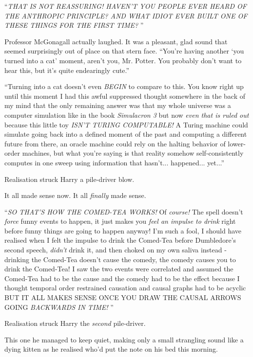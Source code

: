 ``\emph{THAT IS NOT REASSURING! HAVEN'T YOU PEOPLE EVER HEARD OF THE
ANTHROPIC PRINCIPLE? AND WHAT IDIOT EVER BUILT ONE OF THESE THINGS FOR
THE FIRST TIME?} ''

Professor McGonagall actually laughed. It was a pleasant, glad sound
that seemed surprisingly out of place on that stern face. ``You're
having another `you turned into a cat' moment, aren't you, Mr. Potter.
You probably don't want to hear this, but it's quite endearingly cute.''

``Turning into a cat doesn't even \emph{BEGIN} to compare to this. You
know right up until this moment I had this awful suppressed thought
somewhere in the back of my mind that the only remaining answer was that
my whole universe was a computer simulation like in the book
\emph{Simulacron 3} but now \emph{even that is ruled out} because this
little toy \emph{ISN'T TURING COMPUTABLE!} A Turing machine could
simulate going back into a defined moment of the past and computing a
different future from there, an oracle machine could rely on the halting
behavior of lower-order machines, but what you're saying is that reality
somehow self-consistently computes in one sweep using information that
hasn't... happened... yet...''

Realisation struck Harry a pile-driver blow.

It all made sense now. It all \emph{finally} made sense.

``\emph{SO THAT'S HOW THE COMED-TEA WORKS!} Of \emph{course!} The spell
doesn't \emph{force} funny events to happen, it just makes you
\emph{feel an impulse to drink} right before funny things are going to
happen anyway! I'm such a fool, I should have realised when I felt the
impulse to drink the Comed-Tea before Dumbledore's second speech,
\emph{didn't} drink it, and then choked on my own saliva instead -
drinking the Comed-Tea doesn't cause the comedy, the comedy causes you
to drink the Comed-Tea! I saw the two events were correlated and assumed
the Comed-Tea had to be the cause and the comedy had to be the effect
because I thought temporal order restrained causation and causal graphs
had to be acyclic BUT IT ALL MAKES SENSE ONCE YOU DRAW THE CAUSAL ARROWS
GOING \emph{BACKWARDS IN TIME!} ''

Realisation struck Harry the \emph{second} pile-driver.

This one he managed to keep quiet, making only a small strangling sound
like a dying kitten as he realised who'd put the note on his bed this
morning.

